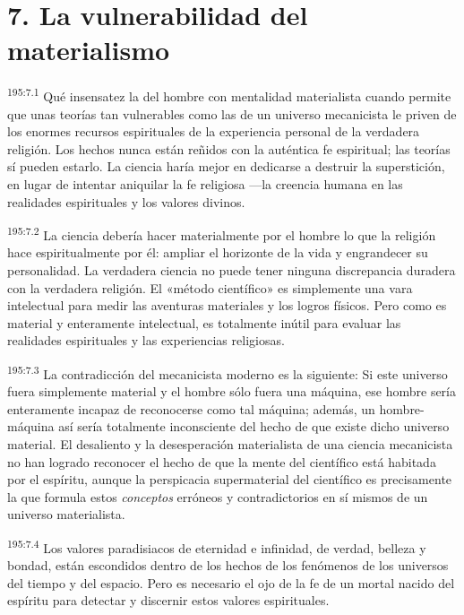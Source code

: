 \section*{7. La vulnerabilidad del materialismo}
\par
\textsuperscript{195:7.1} Qué insensatez la del hombre con mentalidad materialista cuando permite que unas teorías tan vulnerables como las de un universo mecanicista le priven de los enormes recursos espirituales de la experiencia personal de la verdadera religión. Los hechos nunca están reñidos con la auténtica fe espiritual; las teorías sí pueden estarlo. La ciencia haría mejor en dedicarse a destruir la superstición, en lugar de intentar aniquilar la fe religiosa ---la creencia humana en las realidades espirituales y los valores divinos.

\par
\textsuperscript{195:7.2} La ciencia debería hacer materialmente por el hombre lo que la religión hace espiritualmente por él: ampliar el horizonte de la vida y engrandecer su personalidad. La verdadera ciencia no puede tener ninguna discrepancia duradera con la verdadera religión. El «método científico» es simplemente una vara intelectual para medir las aventuras materiales y los logros físicos. Pero como es material y enteramente intelectual, es totalmente inútil para evaluar las realidades espirituales y las experiencias religiosas.

\par
\textsuperscript{195:7.3} La contradicción del mecanicista moderno es la siguiente: Si este universo fuera simplemente material y el hombre sólo fuera una máquina, ese hombre sería enteramente incapaz de reconocerse como tal máquina; además, un hombre-máquina así sería totalmente inconsciente del hecho de que existe dicho universo material. El desaliento y la desesperación materialista de una ciencia mecanicista no han logrado reconocer el hecho de que la mente del científico está habitada por el espíritu, aunque la perspicacia supermaterial del científico es precisamente la que formula estos \textit{conceptos} erróneos y contradictorios en sí mismos de un universo materialista.

\par
\textsuperscript{195:7.4} Los valores paradisiacos de eternidad e infinidad, de verdad, belleza y bondad, están escondidos dentro de los hechos de los fenómenos de los universos del tiempo y del espacio. Pero es necesario el ojo de la fe de un mortal nacido del espíritu para detectar y discernir estos valores espirituales.

